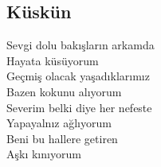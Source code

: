 \subsection{Küskün}

Sevgi dolu bakışların arkamda \\
Hayata küsüyorum \\
Geçmiş olacak yaşadıklarımız \\
Bazen kokunu alıyorum \\
Severim belki diye her nefeste \\
Yapayalnız ağlıyorum \\
Beni bu hallere getiren \\
Aşkı kınıyorum